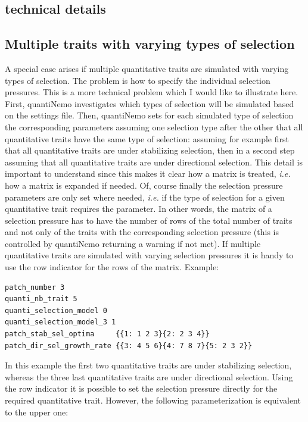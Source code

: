 \documentclass[letterpaper,12pt,oneside]{book}
\begin{document}
\begin{appendices}
\chapter{technical details}\label{chap:TechnicalDetails}
\section{Multiple traits with varying types of selection}
A special case arises if multiple quantitative traits are simulated with varying types of selection. The problem is how to specify the individual selection pressures. This is a more technical problem which I would like to illustrate here. First, quantiNemo investigates which types of selection will be simulated based on the settings file. Then, quantiNemo sets for each simulated type of selection the corresponding parameters assuming one selection type after the other that all quantitative traits have the same type of selection: assuming for example first that all quantitative traits are under stabilizing selection, then in a second step assuming that all quantitative traits are under directional selection. This detail is important to understand since this makes it clear how a matrix is treated, \textit{i.e.} how a matrix is expanded if needed. Of, course finally the selection pressure parameters are only set where needed, \textit{i.e.} if the type of selection for a given quantitative trait requires the parameter. In other words, the matrix of a selection pressure has to have the number of rows of the total number of traits and not only of the traits with the corresponding selection pressure (this is controlled by quantiNemo returning a warning if not met). If multiple quantitative traits are simulated with varying selection pressures it is handy to use the row indicator for the rows of the matrix. Example:
\begin{lstlisting}[frame=single]
patch_number 3
quanti_nb_trait 5 
quanti_selection_model 0    
quanti_selection_model_3 1
patch_stab_sel_optima     {{1: 1 2 3}{2: 2 3 4}}
patch_dir_sel_growth_rate {{3: 4 5 6}{4: 7 8 7}{5: 2 3 2}}
\end{lstlisting}
In this example the first two quantitative traits are under stabilizing selection, whereas the three last quantitative traits are under directional selection. Using the row indicator it is possible to set the selection pressure directly for the required quantitative trait. However, the following parameterization is equivalent to the upper one:

\end{appendices}
\end{document}
